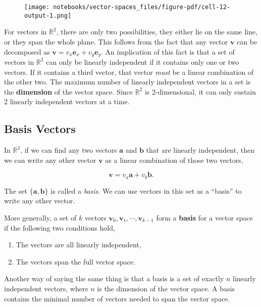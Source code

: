 \documentclass[
  letterpaper,
  DIV=11,
  numbers=noendperiod]{scrreprt}
\providecommand{\tightlist}{%
  \setlength{\itemsep}{0pt}\setlength{\parskip}{0pt}}\usepackage{longtable,booktabs,array}
\begin{document}
\begin{figure}[H]

{\centering \texttt{[image: notebooks/vector-spaces\_files/figure-pdf/cell-12-output-1.png]}

}

\end{figure}

For vectors in \(\mathbb{R}^2\), there are only two possibilities, they
either lie on the same line, or they span the whole plane. This follows
from the fact that any vector \(\mathbf{v}\) can be decomposed as
\(\mathbf{v} = v_x \mathbf{e}_x + v_y \mathbf{e}_y\). An implication of
this fact is that a set of vectors in \(\mathbb{R}^2\) can only be
linearly independent if it contains only one or two vectors. If it
contains a third vector, that vector \emph{must} be a linear combination
of the other two. The maximum number of linearly independent vectors in
a set is the \textbf{dimension} of the vector space. Since
\(\mathbb{R}^2\) is 2-dimensional, it can only sustain 2 linearly
independent vectors at a time.

\hypertarget{basis-vectors}{%
\subsection{Basis Vectors}\label{basis-vectors}}

In \(\mathbb{R}^2\), if we can find any two vectors \(\mathbf{a}\) and
\(\mathbf{b}\) that are linearly independent, then we can write any
other vector \(\mathbf{v}\) as a linear combination of those two
vectors,

\[\mathbf{v} = v_a \mathbf{a} + v_b \mathbf{b}.\]

The set \(\{\mathbf{a}, \mathbf{b}\}\) is called a \emph{basis}. We can
use vectors in this set as a ``basis'' to write any other vector.

More generally, a set of \(k\) vectors
\(\mathbf{v}_0, \mathbf{v}_1, \cdots, \mathbf{v}_{k-1}\) form a
\textbf{basis} for a vector space if the following two conditions hold,

\begin{enumerate}
\def\labelenumi{\arabic{enumi}.}
\tightlist
\item
  The vectors are all linearly independent,
\item
  The vectors span the full vector space.
\end{enumerate}

Another way of saying the same thing is that a basis is a set of exactly
\(n\) linearly independent vectors, where \(n\) is the dimension of the
vector space. A basis contains the minimal number of vectors needed to
span the vector space.
\end{document}
